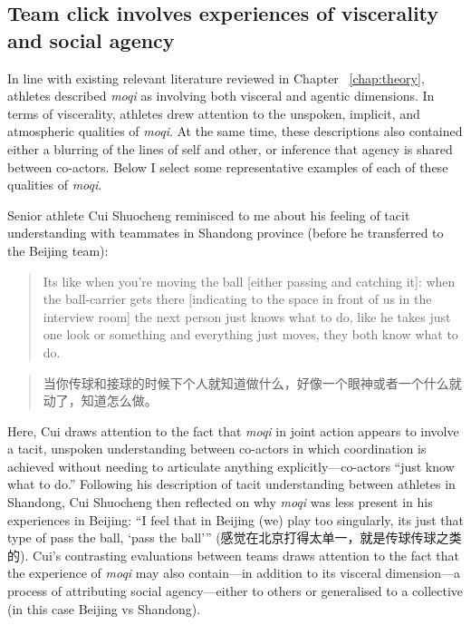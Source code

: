 \begin{CJK}{UTF8}{gbsn}
\subsection{Team click involves experiences of viscerality and social agency}
In line with existing relevant literature reviewed in Chapter ~\ref{chap:theory}, athletes described \textit{moqi} as involving both visceral and agentic dimensions.  In terms of viscerality, athletes drew attention to the unspoken, implicit, and atmospheric qualities of \textit{moqi}.  At the same time, these descriptions also contained either a blurring of the lines of self and other, or inference that agency is shared between co-actors.  Below I select some representative examples of each of these qualities of \textit{moqi}.

Senior athlete Cui Shuocheng reminisced to me about his feeling of tacit understanding with teammates in Shandong province (before he transferred to the Beijing team):

\begin{quote}
       Its like when you're moving the ball [either passing and catching it]: when the ball-carrier gets there [indicating to the space in front of us in the interview room] the next person just knows what to do, like he takes just one look or something and everything just moves, they both know what to do.
\end{quote}

\begin{quote}
         当你传球和接球的时候下个人就知道做什么，好像一个眼神或者一个什么就动了，知道怎么做。
\end{quote}

Here, Cui draws attention to the fact that \textit{moqi} in joint action appears to involve a tacit, unspoken understanding between co-actors in which coordination is achieved without needing to articulate anything explicitly---co-actors ``just know what to do.''   Following his description of tacit understanding between athletes in Shandong, Cui Shuocheng then reflected on why \textit{moqi} was less present in his experiences in Beijing: ``I feel that in Beijing (we) play too singularly, its just that type of pass the ball, `pass the ball'''  (感觉在北京打得太单一，就是传球传球之类的).  Cui's contrasting evaluations  between teams draws attention to the fact that the experience of \textit{moqi} may also contain---in addition to its visceral dimension---a process of attributing social agency---either to others or generalised to a collective (in this case Beijing vs Shandong).


\end{CJK}
